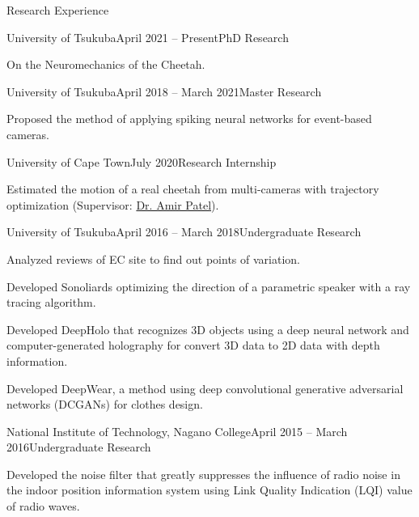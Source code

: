 \documentclass{resume} %
\begin{document}
\begin{rSection}{Research Experience}

    \begin{rSubsection}{University of Tsukuba}{April 2021 -- Present}{PhD Research}{}
    \item On the Neuromechanics of the Cheetah.
    \end{rSubsection}

    \begin{rSubsection}{University of Tsukuba}{April 2018 -- March 2021}{Master Research}{}
    \item Proposed the method of applying spiking neural networks for event-based cameras.
    \end{rSubsection}

    \begin{rSubsection}{University of Cape Town}{July 2020}{Research Internship}{}
    \item Estimated the motion of a real cheetah from multi-cameras with trajectory optimization (Supervisor: \href{https://scholar.google.co.za/citations?user=RxMigV4AAAAJ&view_op=list_works&sortby=pubdate}{Dr. Amir Patel}).
    \end{rSubsection}

    \begin{rSubsection}{University of Tsukuba}{April 2016 -- March 2018}{Undergraduate Research}{}
    \item Analyzed reviews of EC site to find out points of variation.
    \item Developed Sonoliards optimizing the direction of a parametric speaker with a ray tracing algorithm.
    \item Developed DeepHolo that recognizes 3D objects using a deep neural network and computer-generated holography for convert 3D data to 2D data with depth information.
    \item Developed DeepWear, a method using deep convolutional generative adversarial networks (DCGANs) for clothes design.
    \end{rSubsection}

    \begin{rSubsection}{National Institute of Technology, Nagano College}{April 2015 -- March 2016}{Undergraduate Research}{}
    \item Developed the noise filter that greatly suppresses the influence of radio noise in the indoor position information system using Link Quality Indication (LQI) value of radio waves.
    \end{rSubsection}

\end{rSection}
\end{document}
